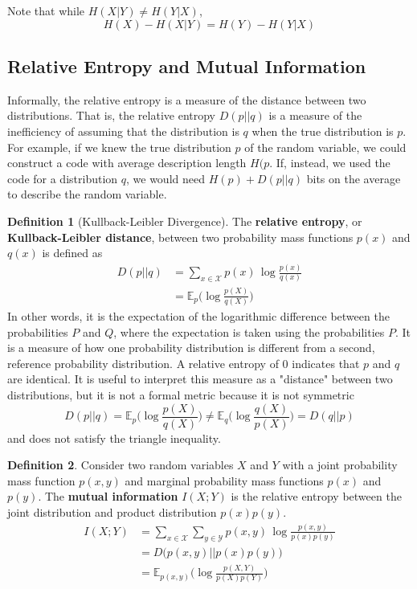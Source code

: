 \documentclass[a4paper, 12pt]{report}
\theoremstyle{remark}
\theoremstyle{definition}
\newtheorem{definition}{Definition}[section]
\begin{document}
Note that while $H(X|Y) \neq H(Y|X)$, 
\[H(X) - H(X|Y) = H(Y) - H(Y|X)\]

\subsection{Relative Entropy and Mutual Information}
Informally, the relative entropy is a measure of the distance between two distributions. That is, the relative entropy $D(p||q)$ is a measure of the inefficiency of assuming that the distribution is $q$ when the true distribution is $p$. For example, if we knew the true distribution $p$ of the random variable, we could construct a code with average description length $H(p$. If, instead, we used the code for a distribution $q$, we would need $H(p) + D(p||q)$ bits on the average to describe the random variable. 

\begin{definition}[Kullback-Leibler Divergence]
The \textbf{relative entropy}, or \textbf{Kullback-Leibler distance}, between two probability mass functions $p(x)$ and $q(x)$ is defined as 
\begin{align*}
    D(p||q) & = \sum_{x \in \mathcal{X}} p(x) \, \log \frac{p(x)}{q(x)} \\
    & = \mathbb{E}_p \bigg( \log \frac{p(X)}{q(X)} \bigg)
\end{align*}
In other words, it is the expectation of the logarithmic difference between the probabilities $P$ and $Q$, where the expectation is taken using the probabilities $P$. It is a measure of how one probability distribution is different from a second, reference probability distribution. A relative entropy of $0$ indicates that $p$ and $q$ are identical. It is useful to interpret this measure as a "distance" between two distributions, but it is not a formal metric because it is not symmetric 
\[D(p||q) = \mathbb{E}_p \bigg( \log \frac{p(X)}{q(X)} \bigg) \neq \mathbb{E}_q \bigg( \log \frac{q(X)}{p(X)} \bigg) = D(q||p)\]
and does not satisfy the triangle inequality. 
\end{definition}

\begin{definition}
Consider two random variables $X$ and $Y$ with a joint probability mass function $p(x, y)$ and marginal probability mass functions $p(x)$ and $p(y)$. The \textbf{mutual information} $I(X; Y)$ is the relative entropy between the joint distribution and product distribution $p(x) p(y)$. 
\begin{align*}
    I(X;Y) & = \sum_{x \in \mathcal{X}} \sum_{y \in \mathcal{Y}} p(x, y)\, \log \frac{p(x, y)}{p(x) p(y)} \\
    & = D\big( p(x, y)||p(x) p(y)\big) \\
    & = \mathbb{E}_{p(x, y)} \bigg( \log \frac{p(X, Y)}{p(X) p(Y)} \bigg)
\end{align*}
\end{definition}
\end{document}
